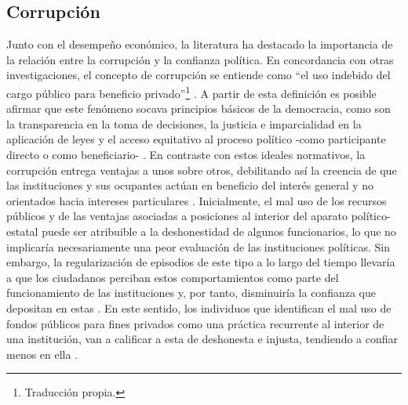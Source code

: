\documentclass[12pt,twoside]{templates/facsothesis}
\begin{document}
\subsection{Corrupción}\label{corrupciuxf3n}

Junto con el desempeño económico, la literatura ha destacado la importancia de la relación entre la corrupción y la confianza política. En concordancia con otras investigaciones, el concepto de corrupción se entiende como ``el uso indebido del cargo público para beneficio privado''\footnote{Traducción propia.} \citep[32]{sandholtzAccountingCorruptionEconomic2000}. A partir de esta definición es posible afirmar que este fenómeno socava principios básicos de la democracia, como son la transparencia en la toma de decisiones, la justicia e imparcialidad en la aplicación de leyes y el acceso equitativo al proceso político -como participante directo o como beneficiario- \citep{andersonCorruptionPoliticalAllegiances2003}. En contraste con estos ideales normativos, la corrupción entrega ventajas a unos sobre otros, debilitando así la creencia de que las instituciones y sus ocupantes actúan en beneficio del interés general y no orientados hacia intereses particulares \citep{beesleyCorruptionInstitutionalTrust2022, uslanerCorruptionInequalityTrap2013}. Inicialmente, el mal uso de los recursos públicos y de las ventajas asociadas a posiciones al interior del aparato político-estatal puede ser atribuible a la deshonestidad de algunos funcionarios, lo que no implicaría necesariamente una peor evaluación de las instituciones políticas. Sin embargo, la regularización de episodios de este tipo a lo largo del tiempo llevaría a que los ciudadanos perciban estos comportamientos como parte del funcionamiento de las instituciones y, por tanto, disminuiría la confianza que depositan en estas \citep{beesleyCorruptionInstitutionalTrust2022}. En este sentido, los individuos que identifican el mal uso de fondos públicos para fines privados como una práctica recurrente al interior de una institución, van a calificar a esta de deshonesta e injusta, tendiendo a confiar menos en ella \citep{uslanerCorruptionInequalityTrap2013}.
\end{document}
